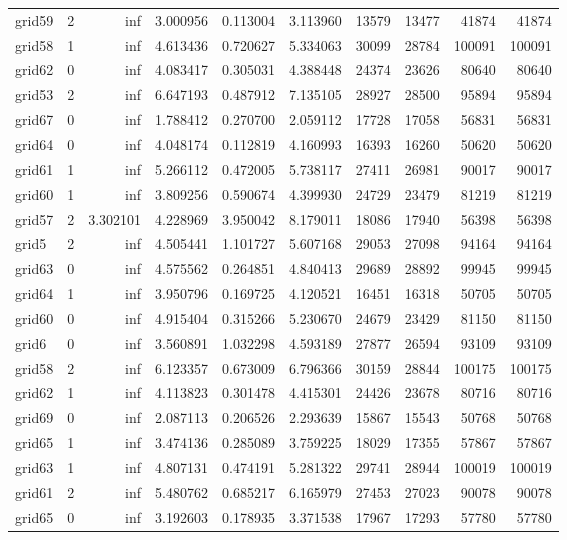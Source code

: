 \begin{longtable}{|l|r|r|r|r|r|r|r|r|r|}
grid59 & 2 & inf & 3.000956 & 0.113004 & 3.113960 & 13579 & 13477 & 41874 & 41874 \\
grid58 & 1 & inf & 4.613436 & 0.720627 & 5.334063 & 30099 & 28784 & 100091 & 100091 \\
grid62 & 0 & inf & 4.083417 & 0.305031 & 4.388448 & 24374 & 23626 & 80640 & 80640 \\
grid53 & 2 & inf & 6.647193 & 0.487912 & 7.135105 & 28927 & 28500 & 95894 & 95894 \\
grid67 & 0 & inf & 1.788412 & 0.270700 & 2.059112 & 17728 & 17058 & 56831 & 56831 \\
grid64 & 0 & inf & 4.048174 & 0.112819 & 4.160993 & 16393 & 16260 & 50620 & 50620 \\
grid61 & 1 & inf & 5.266112 & 0.472005 & 5.738117 & 27411 & 26981 & 90017 & 90017 \\
grid60 & 1 & inf & 3.809256 & 0.590674 & 4.399930 & 24729 & 23479 & 81219 & 81219 \\
grid57 & 2 & 3.302101 & 4.228969 & 3.950042 & 8.179011 & 18086 & 17940 & 56398 & 56398 \\
grid5 & 2 & inf & 4.505441 & 1.101727 & 5.607168 & 29053 & 27098 & 94164 & 94164 \\
grid63 & 0 & inf & 4.575562 & 0.264851 & 4.840413 & 29689 & 28892 & 99945 & 99945 \\
grid64 & 1 & inf & 3.950796 & 0.169725 & 4.120521 & 16451 & 16318 & 50705 & 50705 \\
grid60 & 0 & inf & 4.915404 & 0.315266 & 5.230670 & 24679 & 23429 & 81150 & 81150 \\
grid6 & 0 & inf & 3.560891 & 1.032298 & 4.593189 & 27877 & 26594 & 93109 & 93109 \\
grid58 & 2 & inf & 6.123357 & 0.673009 & 6.796366 & 30159 & 28844 & 100175 & 100175 \\
grid62 & 1 & inf & 4.113823 & 0.301478 & 4.415301 & 24426 & 23678 & 80716 & 80716 \\
grid69 & 0 & inf & 2.087113 & 0.206526 & 2.293639 & 15867 & 15543 & 50768 & 50768 \\
grid65 & 1 & inf & 3.474136 & 0.285089 & 3.759225 & 18029 & 17355 & 57867 & 57867 \\
grid63 & 1 & inf & 4.807131 & 0.474191 & 5.281322 & 29741 & 28944 & 100019 & 100019 \\
grid61 & 2 & inf & 5.480762 & 0.685217 & 6.165979 & 27453 & 27023 & 90078 & 90078 \\
grid65 & 0 & inf & 3.192603 & 0.178935 & 3.371538 & 17967 & 17293 & 57780 & 57780 \\

\end{longtable}
